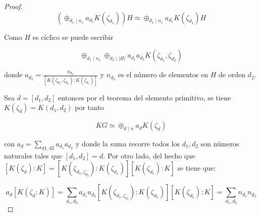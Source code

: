 \begin{proof}
\[ \left( \oplus_{d_1\mid n_1}a_{d_1}K(\zeta_{d_1}) \right)H \simeq \oplus_{d_1 \mid n_1} a_{d_1}K(\zeta_{d_1})H   \]

Como $H$ es cíclico se puede escribir

\[ \oplus_{d_1\mid n_1}\oplus_{d_2\mid |H|}a_{d_1}a_{d_2}K(\zeta_{d_1}, \zeta_{d_2})  \]

donde $a_{d_2} = \frac{n_{d_2}}{[K(\zeta_{d_1}, \zeta_{d_2} ): K(\zeta_{d_1})]}$ y $n_{d_2}$ es el número de elementos en $H$ de orden $d_2$.

Sea $d = [d_1, d_2]$ entonces por el teorema del elemento primitivo, se tiene $K(\zeta_d) = K(d_1,d_2)$ por tanto 

\[ KG \simeq \oplus_{d\mid n}a_dK(\zeta_d)  \]

con $a_d = \sum_{d1,d2}a_{d_1}a_{d_2}$ y donde la  suma recorre todos los $d_1,d_2$ son números naturales tales que $[d_1,d_2] = d$. Por otro lado, del hecho que $[K(\zeta_d):K] = [K(\zeta_{d_1, \zeta_{d_2}}): K(\zeta_{d_1})][K(\zeta_{d_1}):K] $ se tiene que: 


\[ a_d[K(\zeta_{d} :K)] = \sum_{d_1,d_2}a_{d_1}a_{d_2}[K(\zeta_{d_1, \zeta_{d_2}}): K(\zeta_{d_1})][K(\zeta_{d_1}):K] = \sum_{d_1,d_2}n_{d_1}n_{d_2}   \] \qedhere
\end{proof}